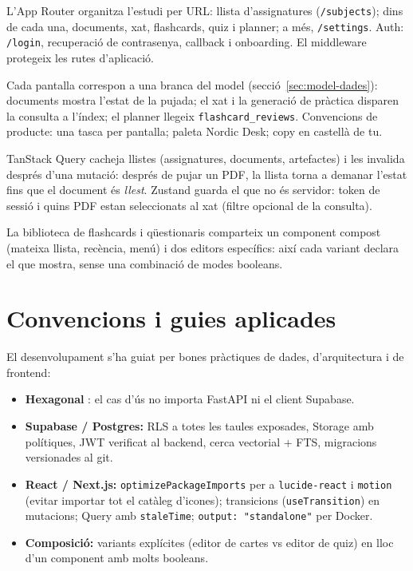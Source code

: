 L'App Router organitza l'estudi per URL: llista d'assignatures (\texttt{/subjects}); dins de cada una, documents, xat, flashcards, quiz i planner; a més, \texttt{/settings}. Auth: \texttt{/login}, recuperació de contrasenya, callback i onboarding. El middleware protegeix les rutes d'aplicació.

Cada pantalla correspon a una branca del model (secció~\ref{sec:model-dades}): documents mostra l'estat de la pujada; el xat i la generació de pràctica disparen la consulta a l'índex; el planner llegeix \texttt{flashcard\_reviews}. Convencions de producte: una tasca per pantalla; paleta Nordic Desk; copy en castellà de tu.

TanStack Query cacheja llistes (assignatures, documents, artefactes) i les invalida després d'una mutació: després de pujar un PDF, la llista torna a demanar l'estat fins que el document és \emph{llest}. Zustand guarda el que no és servidor: token de sessió i quins PDF estan seleccionats al xat (filtre opcional de la consulta).

La biblioteca de flashcards i qüestionaris comparteix un component compost (mateixa llista, recència, menú) i dos editors específics: així cada variant declara el que mostra, sense una combinació de modes booleans.

\section{Convencions i guies aplicades}

El desenvolupament s'ha guiat per bones pràctiques de dades, d'arquitectura i de frontend:

\begin{itemize}
  \item \textbf{Hexagonal} \parencite{cockburn2005hexagonal}: el cas d'ús no importa FastAPI ni el client Supabase.
  \item \textbf{Supabase / Postgres:} RLS a totes les taules exposades, Storage amb polítiques, JWT verificat al backend, cerca vectorial + FTS, migracions versionades al git.
  \item \textbf{React / Next.js:} \texttt{optimizePackageImports} per a \texttt{lucide-react} i \texttt{motion} (evitar importar tot el catàleg d'icones); transicions (\texttt{useTransition}) en mutacions; Query amb \texttt{staleTime}; \texttt{output: "standalone"} per Docker.
  \item \textbf{Composició:} variants explícites (editor de cartes vs editor de quiz) en lloc d'un component amb molts booleans.
\end{itemize}

